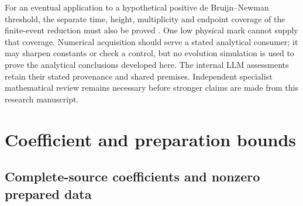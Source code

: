 \documentclass[11pt]{article}
\numberwithin{equation}{section}
\begin{document}
For an eventual application to a hypothetical positive
de Bruijn--Newman threshold, the separate time, height, multiplicity
and endpoint coverage of the finite-event reduction must also be proved
\cite{ThresholdNote}. One low physical mark cannot supply that coverage.
Numerical acquisition should serve a stated analytical consumer; it may
sharpen constants or check a control, but no evolution simulation is used
to prove the analytical conclusions developed here. The internal LLM
assessments retain their stated provenance and shared premises. Independent
specialist mathematical review remains necessary before stronger claims
are made from this research manuscript.


\clearpage
\appendix
\section{Coefficient and preparation bounds}

\subsection{Complete-source coefficients and nonzero prepared data}
\label{app:weighteddata}
\end{document}
